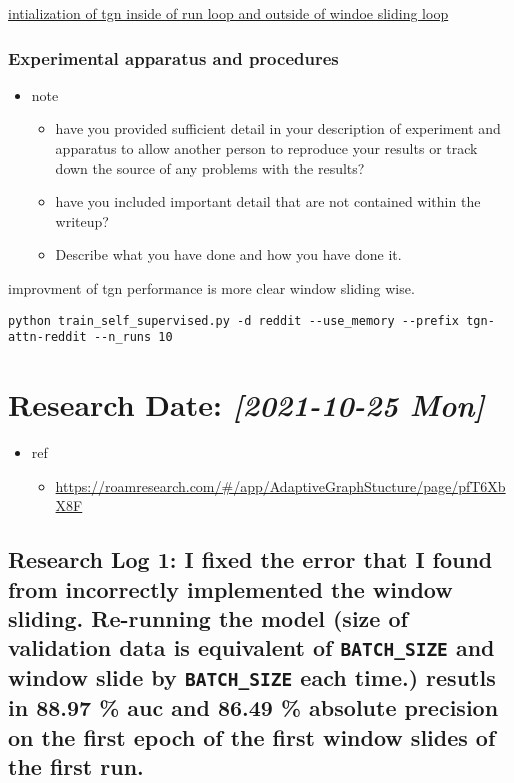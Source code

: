 \documentclass[11pt]{article}
\begin{document}
\href{file:///mnt/c/Users/terng/OneDrive/Documents/Working/tgn/train\_self\_supervised.py}{intialization of tgn inside of run loop and outside of windoe sliding loop}

\subsubsection{Experimental apparatus and procedures}
\label{sec:orga325533}
\begin{itemize}
\item note
\begin{itemize}
\item have you provided sufficient detail in your description of experiment and apparatus to allow another person to reproduce your results or track down the source of any problems with the results?
\item have you included important detail that are not contained within the writeup?
\item Describe what you have done and how you have done it.
\end{itemize}
\end{itemize}

improvment of tgn performance is more clear window sliding wise.
\begin{verbatim}
python train_self_supervised.py -d reddit --use_memory --prefix tgn-attn-reddit --n_runs 10
\end{verbatim}
\section{Research Date: \textit{[2021-10-25 Mon]}}
\label{sec:org9c54eb0}
\begin{itemize}
\item ref
\begin{itemize}
\item \url{https://roamresearch.com/\#/app/AdaptiveGraphStucture/page/pfT6XbX8F}
\end{itemize}
\end{itemize}
\subsection{Research Log 1: I fixed the error that I found from incorrectly implemented the window sliding. Re-running the model (size of validation data is equivalent of \texttt{BATCH\_SIZE} and window slide by   \texttt{BATCH\_SIZE} each time.) resutls in 88.97 \% auc and  86.49 \% absolute precision on the first epoch of the first window slides of the first run.}
\label{sec:org8258469}
\end{document}
